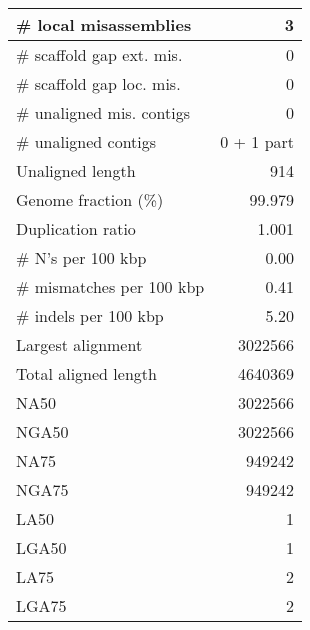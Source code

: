 \documentclass[12pt,a4paper]{article}
\begin{document}
\begin{table}[ht]
\begin{center}
\begin{tabular}{|l*{1}{|r}|}
\# local misassemblies & 3 \\ \hline
\# scaffold gap ext. mis. & 0 \\ \hline
\# scaffold gap loc. mis. & 0 \\ \hline
\# unaligned mis. contigs & 0 \\ \hline
\# unaligned contigs & 0 + 1 part \\ \hline
Unaligned length & 914 \\ \hline
Genome fraction (\%) & 99.979 \\ \hline
Duplication ratio & 1.001 \\ \hline
\# N's per 100 kbp & 0.00 \\ \hline
\# mismatches per 100 kbp & 0.41 \\ \hline
\# indels per 100 kbp & 5.20 \\ \hline
Largest alignment & 3022566 \\ \hline
Total aligned length & 4640369 \\ \hline
NA50 & 3022566 \\ \hline
NGA50 & 3022566 \\ \hline
NA75 & 949242 \\ \hline
NGA75 & 949242 \\ \hline
LA50 & 1 \\ \hline
LGA50 & 1 \\ \hline
LA75 & 2 \\ \hline
LGA75 & 2 \\ \hline
\end{tabular}
\end{center}
\end{table}
\end{document}
